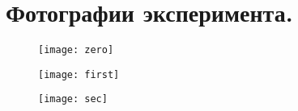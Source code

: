 \documentclass[12pt,a4paper]{article}
\begin{document}
    \section{Фотографии эксперимента.}
    \begin{figure}[h!]
    	\begin{center}
    		\texttt{[image: zero]}\\
        	{\scriptsize
        	\begin{center}
        	\end{center}}
    	\end{center}
        \label{scheme1}
    \end{figure}
            \begin{figure}[h!]
    	\begin{center}
    		\texttt{[image: first]}\\
        	{\scriptsize
        	\begin{center}
        	\end{center}}
    	\end{center}
        \label{scheme1}
    \end{figure}
            \begin{figure}[h!]
    	\begin{center}
    		\texttt{[image: sec]}\\
        	{\scriptsize
        	\begin{center}
        	\end{center}}
    	\end{center}
        \label{scheme1}
    \end{figure}
\end{document}
